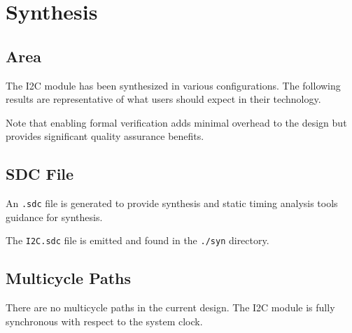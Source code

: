 \section{Synthesis}

\subsection{Area}
The I2C module has been synthesized in various configurations. The following results are representative of what users should expect in their technology.



Note that enabling formal verification adds minimal overhead to the design but provides significant quality assurance benefits.

\subsection{SDC File}
An \texttt{.sdc} file is generated to provide synthesis and static timing analysis tools guidance for synthesis.

The \texttt{I2C.sdc} file is emitted and found in the \texttt{./syn} directory.

\subsection{Multicycle Paths}
There are no multicycle paths in the current design. The I2C module is fully synchronous with respect to the system clock.